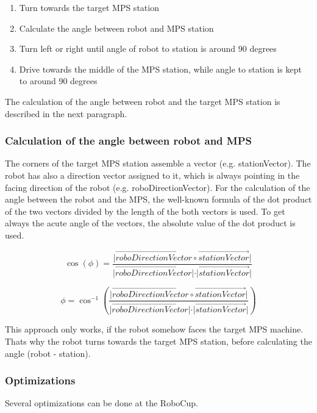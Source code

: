 \begin{enumerate}
\item Turn towards the target MPS station
\item Calculate the angle between robot and MPS station
\item Turn left or right until angle of robot to station is around 90 degrees
\item Drive towards the middle of the MPS station, while angle to station is kept to around 90 degrees
\end{enumerate}

The calculation of the angle between robot and the target MPS station is described in the next paragraph.

\subsubsection{Calculation of the angle between robot and MPS}

The corners of the target MPS station assemble a vector (e.g. stationVector). The robot has also a direction vector assigned to it, which is always pointing in the facing direction of the robot (e.g. roboDirectionVector). For the calculation of the angle between the robot and the MPS, the well-known formula of the dot product of the two vectors divided by the length of the both vectors is used. To get always the acute angle of the vectors, the absolute value of the dot product is used. 

\begin{equation}
\cos(\phi) = \frac{ \vert \overrightarrow{roboDirectionVector} \circ \overrightarrow{stationVector} \vert} { \vert \overrightarrow{roboDirectionVector}  \vert  \cdot \vert \overrightarrow{stationVector}  \vert}
\end{equation}

\begin{equation}
\phi = \cos ^{ - 1} \left( \frac{ \vert \overrightarrow{roboDirectionVector} \circ \overrightarrow{stationVector} \vert} { \vert \overrightarrow{roboDirectionVector}  \vert  \cdot \vert \overrightarrow{stationVector}  \vert} \right)
\end{equation}


This approach only works, if the robot somehow faces the target MPS machine. Thats why the robot turns towards the target MPS station, before calculating the angle (robot - station). 


\subsubsection{Optimizations}
Several optimizations can be done at the RoboCup. 

